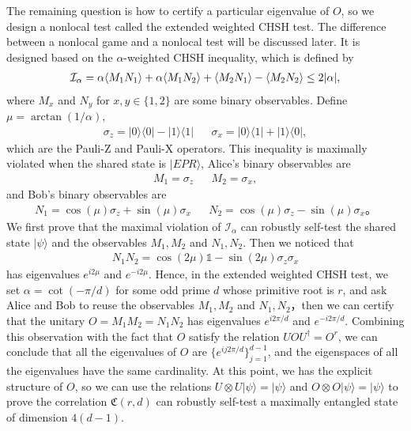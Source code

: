 \documentclass[11pt,letterpaper]{article}
\newcommand{\ket}[1]{|#1\rangle}
\newcommand{\ketbra}[2]{|#1\rangle\langle#2|}
\newcommand{\x}{\otimes}
\newcommand{\ct}{^{\dagger}}
\DeclarePairedDelimiter{\ip}{\langle}{\rangle}
\newcommand{\1}{\mathbb{1}}
\newcommand{\paulix}{\sigma_x}
\newcommand{\pauliz}{\sigma_z}
\newcommand{\fC}{\mathfrak{C}}
\newcommand{\I}{\mathcal{I}}
\theoremstyle{definition}
\begin{document}
The remaining question is how to certify a particular eigenvalue of $O$, so we
design a nonlocal test called the extended weighted CHSH test.
The difference between a nonlocal game and a nonlocal test will be discussed later.
It is designed based on the $\alpha$-weighted CHSH inequality, which is defined by
\begin{align*}
    \I_\alpha = \alpha\ip{M_1N_1}+\alpha\ip{M_1N_2} + \ip{M_2N_1} - \ip{M_2N_2}\leq 2|\alpha|,
\end{align*}
where $M_x$ and $N_y$ for $x,y \in \{1, 2\}$ are some binary observables.
Define $\mu = \arctan(1/\alpha)$,
\begin{align*}
    \pauliz = \ketbra{0}{0} - \ketbra{1}{1} && \paulix = \ketbra{0}{1} + \ketbra{1}{0},
\end{align*}
which are the Pauli-Z and Pauli-X operators.
This inequality is maximally violated when the shared state is $\ket{EPR}$,
Alice's binary observables are
\begin{align*}
    M_1 = \pauliz && M_2 = \paulix,
\end{align*}
and Bob's binary observables are
\begin{align*}
    N_1 = \cos(\mu) \pauliz+ \sin(\mu) \paulix  && N_2 = \cos(\mu) \pauliz - \sin(\mu) \paulix。
\end{align*}
We first prove that the maximal violation of $\I_\alpha$ can robustly self-test the shared
state $\ket{\psi}$ and the observables $M_1, M_2$ and $N_1, N_2$.
Then we noticed that 
\begin{align*}
    N_1N_2 = \cos(2\mu) \1  - \sin(2 \mu) \pauliz \paulix 
\end{align*}
has eigenvalues $e^{i 2\mu}$ and $e^{-i 2\mu}$.
Hence, in the extended weighted CHSH test, we set $\alpha = \cot( -\pi/d )$
for some odd prime $d$ whose primitive root is $r$,
and ask Alice and Bob
to reuse the observables $M_1, M_2$ and $N_1, N_2$，then we can certify that
the unitary $O = M_1M_2 = N_1N_2$ has eigenvalues $e^{i2\pi/d}$ and $e^{-i2\pi/d}$.
Combining this observation with the fact that $O$ satisfy the relation $UOU\ct = O^r$,
we can conclude that all the eigenvalues of $O$ are $\{ e^{ij 2\pi /d} \}_{j=1}^{d-1}$,
and the eigenspaces of all the eigenvalues have the same cardinality.
At this point, we has the explicit structure of $O$, so we 
can use the relations $U \x U \ket{\psi} = \ket{\psi}$ and $ O \x O \ket{\psi} = \ket{\psi}$
to prove the correlation $\fC(r, d)$ can robustly self-test 
a maximally entangled state of dimension $4(d-1)$.
\end{document}
